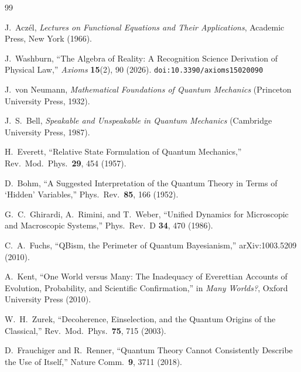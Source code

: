 \documentclass[12pt,a4paper]{article}
\theoremstyle{definition}
\theoremstyle{remark}
\begin{document}
\begin{thebibliography}{99}

J.~Acz\'el, \emph{Lectures on Functional Equations and Their Applications},
Academic Press, New York (1966).

J.~Washburn, ``The Algebra of Reality: A Recognition Science Derivation
of Physical Law,'' \emph{Axioms} \textbf{15}(2), 90 (2026).
\texttt{doi:10.3390/axioms15020090}

J.~von Neumann, \emph{Mathematical Foundations of Quantum
Mechanics} (Princeton University Press, 1932).

J.~S.~Bell, \emph{Speakable and Unspeakable in Quantum Mechanics}
(Cambridge University Press, 1987).

H.~Everett, ``Relative State Formulation of Quantum Mechanics,''
Rev.\ Mod.\ Phys.\ \textbf{29}, 454 (1957).

D.~Bohm, ``A Suggested Interpretation of the Quantum Theory in
Terms of `Hidden' Variables,'' Phys.\ Rev.\ \textbf{85}, 166
(1952).

G.~C.~Ghirardi, A.~Rimini, and T.~Weber, ``Unified Dynamics for
Microscopic and Macroscopic Systems,'' Phys.\ Rev.\ D \textbf{34},
470 (1986).

C.~A.~Fuchs, ``QBism, the Perimeter of Quantum Bayesianism,''
arXiv:1003.5209 (2010).

A.~Kent, ``One World versus Many: The Inadequacy of Everettian
Accounts of Evolution, Probability, and Scientific Confirmation,''
in \emph{Many Worlds?}, Oxford University Press (2010).

W.~H.~Zurek, ``Decoherence, Einselection, and the Quantum
Origins of the Classical,'' Rev.\ Mod.\ Phys.\ \textbf{75}, 715
(2003).

D.~Frauchiger and R.~Renner, ``Quantum Theory Cannot Consistently
Describe the Use of Itself,'' Nature Comm.\ \textbf{9}, 3711 (2018).

\end{thebibliography}
\end{document}
